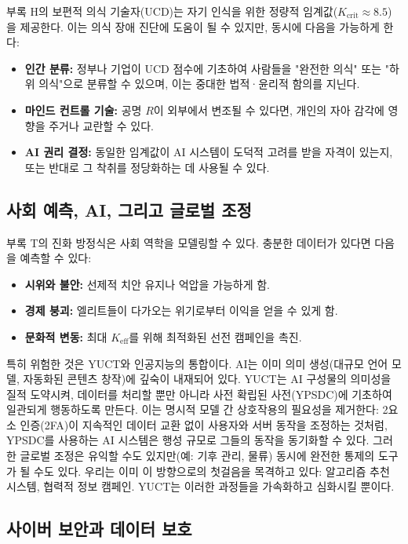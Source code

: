 \documentclass[12pt,a4paper]{article}
\theoremstyle{remark}
\newcommand{\Keff}{K_{\mathrm{eff}}}
\newcommand{\Kcrit}{K_{\mathrm{crit}}}
\begin{document}
	부록 H의 보편적 의식 기술자(UCD)는 자기 인식을 위한 정량적 임계값(\(\Kcrit \approx 8.5\))을 제공한다. 이는 의식 장애 진단에 도움이 될 수 있지만, 동시에 다음을 가능하게 한다:
	\begin{itemize}[leftmargin=*]
		\item \textbf{인간 분류:} 정부나 기업이 UCD 점수에 기초하여 사람들을 "완전한 의식" 또는 "하위 의식"으로 분류할 수 있으며, 이는 중대한 법적·윤리적 함의를 지닌다.
		\item \textbf{마인드 컨트롤 기술:} 공명 \(R\)이 외부에서 변조될 수 있다면, 개인의 자아 감각에 영향을 주거나 교란할 수 있다.
		\item \textbf{AI 권리 결정:} 동일한 임계값이 AI 시스템이 도덕적 고려를 받을 자격이 있는지, 또는 반대로 그 착취를 정당화하는 데 사용될 수 있다.
	\end{itemize}
	
	\subsection{사회 예측, AI, 그리고 글로벌 조정}
	\label{subsec:social}
	
	부록 T의 진화 방정식은 사회 역학을 모델링할 수 있다. 충분한 데이터가 있다면 다음을 예측할 수 있다:
	\begin{itemize}[leftmargin=*]
		\item \textbf{시위와 불안:} 선제적 치안 유지나 억압을 가능하게 함.
		\item \textbf{경제 붕괴:} 엘리트들이 다가오는 위기로부터 이익을 얻을 수 있게 함.
		\item \textbf{문화적 변동:} 최대 \(\Keff\)를 위해 최적화된 선전 캠페인을 촉진.
	\end{itemize}
	
	특히 위험한 것은 YUCT와 인공지능의 통합이다. AI는 이미 의미 생성(대규모 언어 모델, 자동화된 콘텐츠 창작)에 깊숙이 내재되어 있다. YUCT는 AI 구성물의 의미성을 질적 도약시켜, 데이터를 처리할 뿐만 아니라 사전 확립된 사전(YPSDC)에 기초하여 일관되게 행동하도록 만든다. 이는 명시적 모델 간 상호작용의 필요성을 제거한다: 2요소 인증(2FA)이 지속적인 데이터 교환 없이 사용자와 서버 동작을 조정하는 것처럼, YPSDC를 사용하는 AI 시스템은 행성 규모로 그들의 동작을 동기화할 수 있다. 그러한 글로벌 조정은 유익할 수도 있지만(예: 기후 관리, 물류) 동시에 완전한 통제의 도구가 될 수도 있다. 우리는 이미 이 방향으로의 첫걸음을 목격하고 있다: 알고리즘 추천 시스템, 협력적 정보 캠페인. YUCT는 이러한 과정들을 가속화하고 심화시킬 뿐이다.
	
	\subsection{사이버 보안과 데이터 보호}
	\label{subsec:cyber}
	
\end{document}
